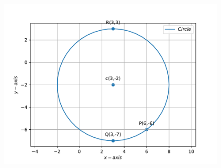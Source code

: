 \documentclass[12pt]{article}
\begin{document}
\begin{enumerate}
\begin{figure}[!h]
\begin{center}
		\includegraphics[width=\columnwidth]{./figs/problem3.pdf}
	\end{center}
\caption{}
\label{fig:Fig1}
\end{figure}
\end{enumerate}
\end{document}
